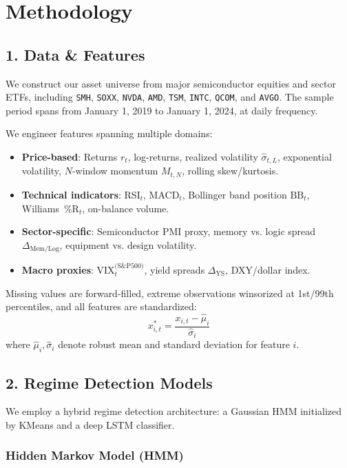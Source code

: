 \section{Methodology}

\subsection{1. Data \& Features}

We construct our asset universe from major semiconductor equities and sector ETFs, including \texttt{SMH}, \texttt{SOXX}, \texttt{NVDA}, \texttt{AMD}, \texttt{TSM}, \texttt{INTC}, \texttt{QCOM}, and \texttt{AVGO}. The sample period spans from January 1, 2019 to January 1, 2024, at daily frequency.

We engineer features spanning multiple domains:
\begin{itemize}
    \item \textbf{Price-based}: Returns $r_t$, log-returns, realized volatility $\hat{\sigma}_{t,L}$, exponential volatility, $N$-window momentum $M_{t,N}$, rolling skew/kurtosis.
    \item \textbf{Technical indicators}: RSI$_t$, MACD$_t$, Bollinger band position $\mathrm{BB}_t$, Williams~\%R$_t$, on-balance volume.
    \item \textbf{Sector-specific}: Semiconductor PMI proxy, memory vs. logic spread $\Delta_{\mathrm{Mem/Log}}$, equipment vs. design volatility.
    \item \textbf{Macro proxies}: VIX$^{\text{(S\&P500)}}_t$, yield spreads $\Delta_{\mathrm{YS}}$, DXY/dollar index.
\end{itemize}

Missing values are forward-filled, extreme observations winsorized at 1st/99th percentiles, and all features are standardized:
\begin{equation}
x^*_{i,t} = \frac{x_{i,t} - \hat{\mu}_i}{\hat{\sigma}_i}
\end{equation}
where $\hat{\mu}_i, \hat{\sigma}_i$ denote robust mean and standard deviation for feature $i$.

\subsection{2. Regime Detection Models}

We employ a hybrid regime detection architecture: a Gaussian HMM initialized by KMeans and a deep LSTM classifier.

\subsubsection*{Hidden Markov Model (HMM)}

